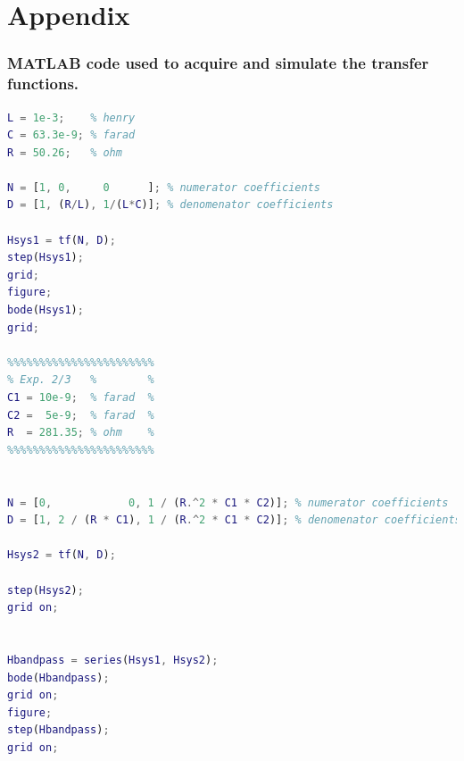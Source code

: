 \documentclass{report}
\begin{document}
\pagebreak
\section*{Appendix}
\subsubsection{MATLAB code used to acquire and simulate the transfer functions.}
\begin{lstlisting}[language=matlab]
L = 1e-3;    % henry
C = 63.3e-9; % farad
R = 50.26;   % ohm

N = [1, 0,     0      ]; % numerator coefficients
D = [1, (R/L), 1/(L*C)]; % denomenator coefficients

Hsys1 = tf(N, D);
step(Hsys1);
grid;
figure;
bode(Hsys1);
grid;

%%%%%%%%%%%%%%%%%%%%%%%
% Exp. 2/3   %        %
C1 = 10e-9;  % farad  %
C2 =  5e-9;  % farad  %
R  = 281.35; % ohm    %
%%%%%%%%%%%%%%%%%%%%%%%


N = [0,            0, 1 / (R.^2 * C1 * C2)]; % numerator coefficients
D = [1, 2 / (R * C1), 1 / (R.^2 * C1 * C2)]; % denomenator coefficients

Hsys2 = tf(N, D);

step(Hsys2);
grid on;


Hbandpass = series(Hsys1, Hsys2);
bode(Hbandpass);
grid on;
figure;
step(Hbandpass);
grid on;
\end{lstlisting}
\end{document}

